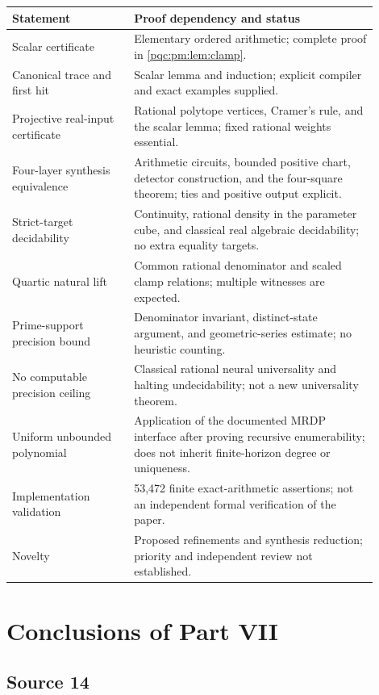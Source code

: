 \documentclass[11pt,letterpaper]{article}
\numberwithin{equation}{section}
\theoremstyle{definition}
\theoremstyle{remark}
\begin{document}
\begin{longtable}{p{0.30\linewidth}p{0.60\linewidth}}
\toprule
Statement & Proof dependency and status\\
\midrule
\endhead
Scalar certificate & Elementary ordered arithmetic; complete proof in
\cref{pqc:pm:lem:clamp}.\\
Canonical trace and first hit & Scalar lemma and induction; explicit
compiler and exact examples supplied.\\
Projective real-input certificate & Rational polytope vertices, Cramer's
rule, and the scalar lemma; fixed rational weights essential.\\
Four-layer synthesis equivalence & Arithmetic circuits, bounded positive
chart, detector construction, and the four-square theorem; ties and
positive output explicit.\\
Strict-target decidability & Continuity, rational density in the parameter
cube, and classical real algebraic decidability; no extra equality targets.\\
Quartic natural lift & Common rational denominator and scaled clamp
relations; multiple witnesses are expected.\\
Prime-support precision bound & Denominator invariant, distinct-state
argument, and geometric-series estimate; no heuristic counting.\\
No computable precision ceiling & Classical rational neural universality
and halting undecidability; not a new universality theorem.\\
Uniform unbounded polynomial & Application of the documented MRDP
interface after proving recursive enumerability; does not inherit
finite-horizon degree or uniqueness.\\
Implementation validation & 53,472 finite exact-arithmetic assertions;
not an independent formal verification of the paper.\\
Novelty & Proposed refinements and synthesis reduction; priority and
independent review not established.\\
\bottomrule
\end{longtable}


\section{Conclusions of Part VII}
\label{pqc:conv:b62-VII:conclusions}
\subsection{Source 14}
\end{document}
